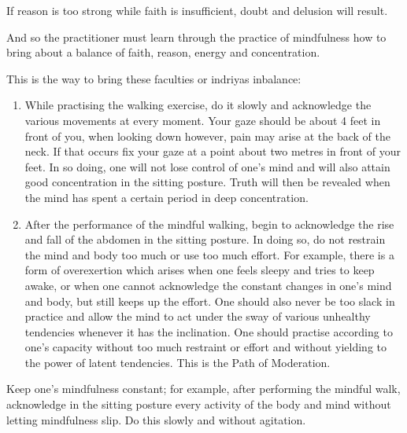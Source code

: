 \documentclass[a5paper,10pt,english]{book}
\begin{document}
\sphinxAtStartPar
If reason is too strong while faith is insufficient, doubt and delusion will result.

\sphinxAtStartPar
And so the practitioner must learn through the practice of mindfulness how to bring about a balance of faith, reason, energy and concentration.

\sphinxAtStartPar
This is the way to bring these faculties or indriyas inbalance:
\begin{enumerate}
%
\item {} 
\sphinxAtStartPar
While practising the walking exercise, do it slowly and acknowledge the various movements at every moment. Your gaze should be about 4 feet in front of you, when looking down however, pain may arise at the back of the neck. If that occurs fix your gaze at a point about two metres in front of your feet. In so doing, one will not lose control of one’s mind and will also attain good concentration in the sitting posture. Truth will then be revealed when the mind has spent a certain period in deep concentration.

\item {} 
\sphinxAtStartPar
After the performance of the mindful walking, begin to acknowledge the rise and fall of the abdomen in the sitting posture. In doing so, do not restrain the mind and body too much or use too much effort. For example, there is a form of over\sphinxhyphen{}exertion which arises when one feels sleepy and tries to keep awake, or when one cannot acknowledge the constant changes in one’s mind and body, but still keeps up the effort. One should also never be too slack in practice and allow the mind to act under the sway of various unhealthy tendencies whenever it has the inclination. One should practise according to one’s capacity without too much restraint or effort and without yielding to the power of latent tendencies. This is the Path of Moderation.

\end{enumerate}

\sphinxAtStartPar
Keep one’s mindfulness constant; for example, after performing the mindful walk, acknowledge in the sitting posture every activity of the body and mind without letting mindfulness slip. Do this slowly and without agitation.
\end{document}
